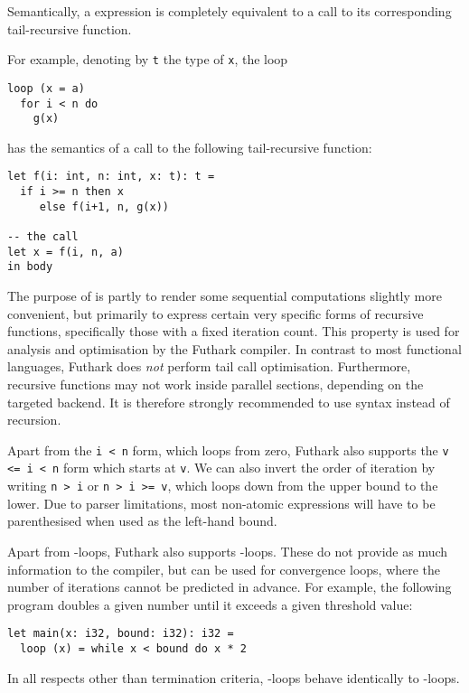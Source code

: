 \documentclass[oneside,11pt]{book}
\begin{document}
Semantically, a  expression is completely equivalent to a
call to its corresponding tail-recursive function.

For example, denoting by \texttt{t} the type of \texttt{x}, the
loop

\begin{lstlisting}
loop (x = a)
  for i < n do
    g(x)
\end{lstlisting}

\noindent
has the semantics of a call to the following tail-recursive function:

\begin{lstlisting}
let f(i: int, n: int, x: t): t =
  if i >= n then x
     else f(i+1, n, g(x))

-- the call
let x = f(i, n, a)
in body
\end{lstlisting}

The purpose of  is partly to render some sequential
computations slightly more convenient, but primarily to express
certain very specific forms of recursive functions, specifically those
with a fixed iteration count.  This property is used for analysis and
optimisation by the Futhark compiler.  In contrast to most functional
languages, Futhark does \textit{not} perform tail call optimisation.
Furthermore, recursive functions may not work inside parallel
sections, depending on the targeted backend.  It is therefore strongly
recommended to use  syntax instead of recursion.

Apart from the \texttt{i < n} form, which loops from zero, Futhark
also supports the \texttt{v <= i < n} form which starts at \texttt{v}.
We can also invert the order of iteration by writing \texttt{n > i} or
\texttt{n > i >= v}, which loops down from the upper bound to the
lower.  Due to parser limitations, most non-atomic expressions will
have to be parenthesised when used as the left-hand bound.

Apart from -loops, Futhark also supports -loops.
These do not provide as much information to the compiler, but can be
used for convergence loops, where the number of iterations cannot be
predicted in advance.  For example, the following program doubles a
given number until it exceeds a given threshold value:

\begin{lstlisting}
let main(x: i32, bound: i32): i32 =
  loop (x) = while x < bound do x * 2
\end{lstlisting}

\noindent
In all respects other than termination criteria, -loops
behave identically to -loops.
\end{document}
